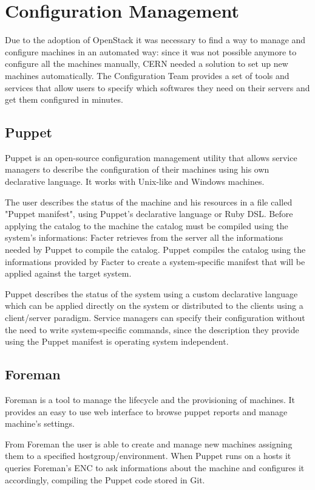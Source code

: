 \section{Configuration Management}

Due to the adoption of OpenStack it was necessary to find a way to manage
and configure machines in an automated way: since it was not possible
anymore to configure all the machines manually, CERN needed a solution to
set up new machines automatically. The Configuration Team provides a set
of tools and services that allow users to specify which softwares they
need on their servers and get them configured in minutes.

\subsection{Puppet}

Puppet is an open-source configuration management utility that allows
service managers to describe the configuration of their machines using his
own declarative language. It works with Unix-like and Windows machines.

The user describes the status of the machine and his resources in a file
called "Puppet manifest", using Puppet's declarative language or Ruby DSL.
Before applying the catalog to the machine the catalog must be compiled
using the system's informations: Facter retrieves from the server all the
informations needed by Puppet to compile the catalog. Puppet compiles the
catalog using the informations provided by Facter to create
a system-specific manifest that will be applied against the target system.

Puppet describes the status of the system using a custom declarative
language which can be applied directly on the system or distributed to the
clients using a client/server paradigm. Service managers can specify their
configuration without the need to write system-specific commands, since
the description they provide using the Puppet manifest is operating system
independent.

\subsection{Foreman}

Foreman is a tool to manage the lifecycle and the provisioning of
machines. It provides an easy to use web interface to browse puppet
reports and manage machine's settings.

From Foreman the user is able to create and manage new machines assigning
them to a specified hostgroup/environment. When Puppet runs on a hosts it
queries Foreman's ENC to ask informations about the machine and configures
it accordingly, compiling the Puppet code stored in Git.

